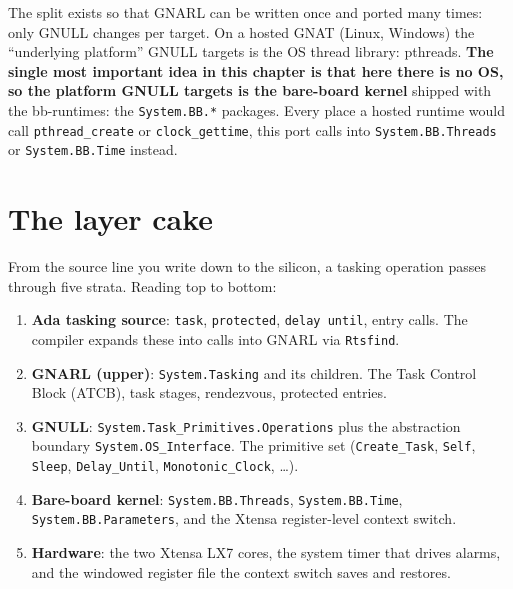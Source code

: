 The split exists so that GNARL can be written once and ported many times: only
GNULL changes per target. On a hosted GNAT (Linux, Windows) the ``underlying
platform'' GNULL targets is the OS thread library: pthreads. \textbf{The
single most important idea in this chapter is that here there is no OS, so the
platform GNULL targets is the bare-board kernel} shipped with the bb-runtimes:
the \texttt{System.BB.*} packages. Every place a hosted runtime would call
\texttt{pthread\_create} or \texttt{clock\_gettime}, this port calls into
\texttt{System.BB.Threads} or \texttt{System.BB.Time} instead.


\section{The layer cake}

From the source line you write down to the silicon, a tasking operation passes
through five strata. Reading top to bottom:

\begin{enumerate}
  \item \textbf{Ada tasking source}: \texttt{task}, \texttt{protected},
        \texttt{delay until}, entry calls. The compiler expands these into calls
        into GNARL via \texttt{Rtsfind}.
  \item \textbf{GNARL (upper)}: \texttt{System.Tasking} and its children. The
        Task Control Block (ATCB), task stages, rendezvous, protected entries.
  \item \textbf{GNULL}: \texttt{System.Task\_Primitives.Operations} plus the
        abstraction boundary \texttt{System.OS\_Interface}. The primitive set
        (\texttt{Create\_Task}, \texttt{Self}, \texttt{Sleep},
        \texttt{Delay\_Until}, \texttt{Monotonic\_Clock}, \dots).
  \item \textbf{Bare-board kernel}: \texttt{System.BB.Threads},
        \texttt{System.BB.Time}, \texttt{System.BB.Parameters}, and the Xtensa
        register-level context switch.
  \item \textbf{Hardware}: the two Xtensa LX7 cores, the system timer that
        drives alarms, and the windowed register file the context switch saves
        and restores.
\end{enumerate}

